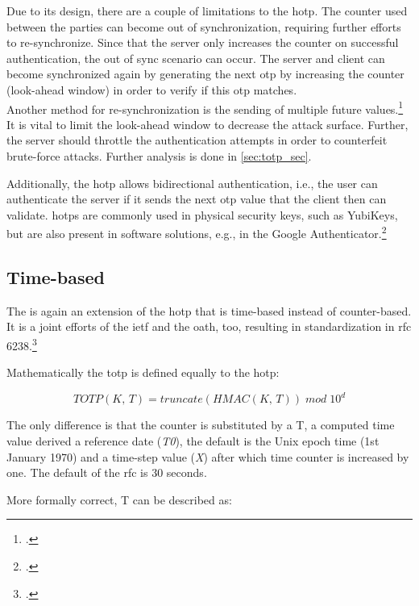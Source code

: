 Due to its design, there are a couple of limitations to the \gls{hotp}. The counter used between the parties can become out of synchronization, requiring further efforts to re-synchronize. Since that the server only increases the counter on successful authentication, the out of sync scenario can occur. The server and client can become synchronized again by generating the next \gls{otp} by increasing the counter (look-ahead window) in order to verify if this \gls{otp} matches.\\
Another method for re-synchronization is the sending of multiple future values.\footcites[See][236]{Schwartz2018}[See][Chapter 13.5.1]{2308830} It is vital to limit the look-ahead window to decrease the attack surface. Further, the server should throttle the authentication attempts in order to counterfeit brute-force attacks. Further analysis is done in \autoref{sec:totp_sec}.

Additionally, the \gls{hotp} allows bidirectional authentication, i.e., the user can authenticate the server if it sends the next \gls{otp} value that the client then can validate. \Glspl{hotp} are commonly used in physical security keys, such as YubiKeys, but are also present in software solutions, e.g., in the Google Authenticator.\footcites[See][716]{HUSEYNOV2017715}[See][14]{m2005rfc}

\subsection{Time-based}
\label{subsec:totp}

The  is again an extension of the \gls{hotp} that is time-based instead of counter-based. It is a joint efforts of the \gls{ietf} and the \gls{oath}, too, resulting in standardization in \gls{rfc} 6238.\footcite[See][]{m2011rfc}

Mathematically the \gls{totp} is defined equally to the \gls{hotp}:

\begin{equation*}
	TOTP(K,\, T) = truncate(HMAC(K,\, T))\; mod \; 10^d
\end{equation*}

The only difference is that the counter is substituted by a T, a computed time value derived a reference date (\textit{T0}), the default is the Unix epoch time (1st January 1970) and a time-step value (\textit{X}) after which time counter is increased by one. The default of the \gls{rfc} is 30 seconds.

More formally correct, T can be described as:

